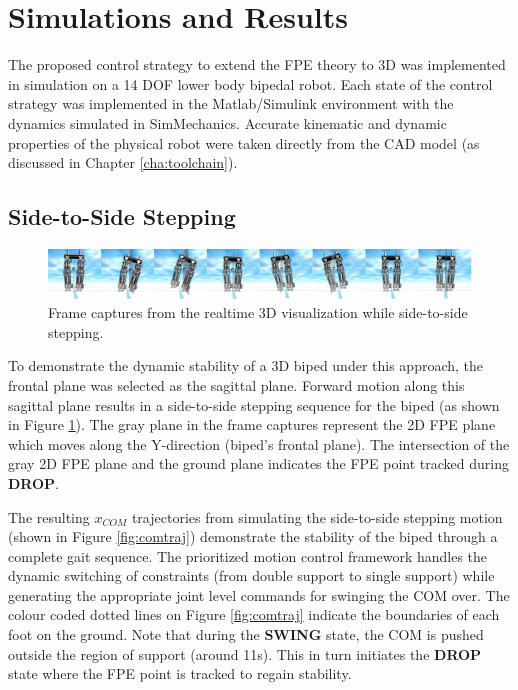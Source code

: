 \section{Simulations and Results} %
\label{sec:simulations_and_results}

The proposed control strategy to extend the FPE theory to 3D was implemented in simulation on a 14 DOF lower body bipedal robot. Each state of the control strategy was implemented in the Matlab/Simulink environment with the dynamics simulated in SimMechanics. Accurate kinematic and dynamic properties of the physical robot were taken directly from the CAD model (as discussed in Chapter \ref{cha:toolchain}).

\subsection{Side-to-Side Stepping} %
\label{sub:3d_simulations}

\begin{figure}[!b]
	\centering
    \includegraphics[scale=0.10]{fig/ch4/sequence.png}
  	\caption{Frame captures from the realtime 3D visualization while side-to-side stepping.}
	\label{fig:sequence}
\end{figure}

To demonstrate the dynamic stability of a 3D biped under this approach, the frontal plane was selected as the sagittal plane. Forward motion along this sagittal plane results in a side-to-side stepping sequence for the biped (as shown in Figure \ref{fig:sequence}). The gray plane in the frame captures represent the 2D FPE plane which moves along the Y-direction (biped's frontal plane). The intersection of the gray 2D FPE plane and the ground plane indicates the FPE point tracked during \textbf{DROP}. 

The resulting $x_{COM}$ trajectories from simulating the side-to-side stepping motion (shown in Figure \ref{fig:comtraj}) demonstrate the stability of the biped through a complete gait sequence. The prioritized motion control framework handles the dynamic switching of constraints (from double support to single support) while generating the appropriate joint level commands for swinging the COM over. The colour coded dotted lines on Figure \ref{fig:comtraj} indicate the boundaries of each foot on the ground. Note that during the \textbf{SWING} state, the COM is pushed outside the region of support (around 11s). This in turn initiates the \textbf{DROP} state where the FPE point is tracked to regain stability.

